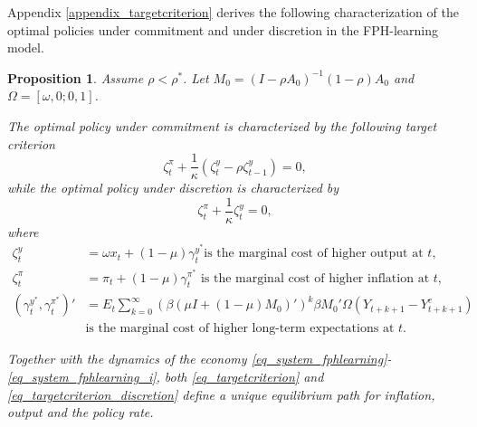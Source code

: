 \documentclass{article}
\newtheorem{proposition}{Proposition}
\begin{document}
Appendix \ref{appendix_targetcriterion} derives the following characterization of the optimal policies under commitment and under discretion in the FPH-learning model.
\begin{proposition}\label{proposition_targetcriterion}
Assume $\rho<\rho^*$. Let $M_0 = (I-\rho A_0)^{-1} (1-\rho)A_0$ and $\Omega = [\omega,0;0,1]$.

The optimal policy under commitment is characterized by the following target criterion
\begin{equation}
\zeta_t^{\pi} + \frac{1}{\kappa} (\zeta_t^y-\rho \zeta_{t-1}^y) = 0,\label{eq_targetcriterion}
\end{equation}
while the optimal policy under discretion is characterized by
\begin{equation}
\zeta_t^{\pi} + \frac{1}{\kappa} \zeta_t^y = 0,\label{eq_targetcriterion_discretion}
\end{equation}
where
\begin{align}
\zeta_t^{y} &= \omega x_t +(1-\mu) \gamma_t^{y^*} \text{is the marginal cost of higher output at $t$},\label{eq_zetay}\\
\zeta_t^{\pi} &= \pi_t +(1-\mu) \gamma_t^{\pi^*} \text{ is the marginal cost of higher inflation at $t$},\label{eq_zetapi}\\
(\gamma_t^{y^*},\gamma_t^{\pi^*})'
&= E_t \sum_{k=0}^{\infty} (\beta (\mu I + (1-\mu) M_0)')^k  \beta M_0'\Omega (Y_{t+k+1}-Y_{t+k+1}^e)\label{eq_gamma}\\
&\text{is the marginal cost of higher long-term expectations at $t$}.\nonumber
\end{align}

Together with the dynamics of the economy \eqref{eq_system_fphlearning}-\eqref{eq_system_fphlearning_i}, both \eqref{eq_targetcriterion} and \eqref{eq_targetcriterion_discretion} define a unique equilibrium path for inflation, output and the policy rate.
\end{proposition}
\end{document}
